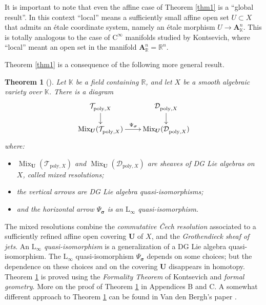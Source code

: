 \documentclass{conm-p-l}
\newtheorem{thm}[equation]{Theorem}
\theoremstyle{definition}
\numberwithin{equation}{section}
\newcommand{\opn}{\operatorname}
\newcommand{\mcal}[1]{\mathcal{#1}}
\newcommand{\mbf}[1]{\mathbf{#1}}
\newcommand{\mrm}[1]{\mathrm{#1}}
\newcommand{\mbb}[1]{\mathbb{#1}}
\newcommand{\bsym}[1]{\boldsymbol{#1}}
\newcommand{\K}{\mbb{K}}
\newcommand{\R}{\mbb{R}}
\begin{document}
It is important to note that even the affine case of Theorem \ref{thm1} is a
``global result''. In this context ``local'' means a sufficiently small affine
open set $U \subset X$ that admits an \'etale coordinate system, namely an 
\'etale morphism $U \to \mbf{A}^n_{\K}$. This is totally analogous to the case
of $\mrm{C}^{\infty}$ manifolds studied by Kontsevich, where ``local'' meant an
open set in the manifold $\mbf{A}^n_{\R} = \R^n$.

Theorem \ref{thm1} is a consequence of the following more general
result.

\begin{thm}[\cite{Ye1}] \label{thm2} 
Let $\K$ be a field containing $\mbb{R}$, and let $X$ be a
smooth algebraic variety over $\K$. There is a diagram 
\[ \UseTips \xymatrix @C=5ex @R=3.5ex {
\mcal{T}^{}_{\mrm{poly}, X} 
\ar[d]
& \mcal{D}^{}_{\mrm{poly}, X}
\ar[d] \\
\opn{Mix}_{\bsym{U}}(\mcal{T}^{}_{\mrm{poly}, X} ) 
\ar[r]^{\Psi_{\bsym{\sigma}}}
&
\opn{Mix}_{\bsym{U}}(\mcal{D}^{}_{\mrm{poly}, X} )
} \] 
where:
\begin{itemize}
\item $\opn{Mix}_{\bsym{U}}(\mcal{T}^{}_{\mrm{poly}, X})$
and
$\opn{Mix}_{\bsym{U}}(\mcal{D}^{}_{\mrm{poly}, X})$
are sheaves of DG Lie algebras on $X$, called {\em mixed
resolutions};
\item the vertical arrows are DG Lie algebra quasi-isomorphisms;
\item and the horizontal arrow $\Psi_{\bsym{\sigma}}$
is an $\mrm{L}_{\infty}$ quasi-isomorphism. 
\end{itemize}
\end{thm}

The mixed resolutions combine the {\em commutative \v{C}ech 
resolution} associated to a sufficiently refined affine open covering $\bsym{U}$
of $X$, and the {\em Grothendieck sheaf of jets}. 
An {\em $\mrm{L}_{\infty}$ quasi-isomorphism} is a
generalization of a DG Lie algebra quasi-iso\-mor\-phism. 
The $\mrm{L}_{\infty}$ quasi-isomorphism $\Psi_{\bsym{\sigma}}$ depends on some
choices; but the dependence on these choices and on the covering 
$\bsym{U}$ disappears in homotopy. 
Theorem \ref{thm2} is proved using the {\em Formality Theorem}
of Kontsevich \cite{Ko1} and {\em formal geometry}.
More on the proof of Theorem \ref{thm2} in Appendices B and C.
A somewhat different approach to Theorem \ref{thm2} can be found in Van den
Bergh's paper \cite{VdB}. 
\end{document}
